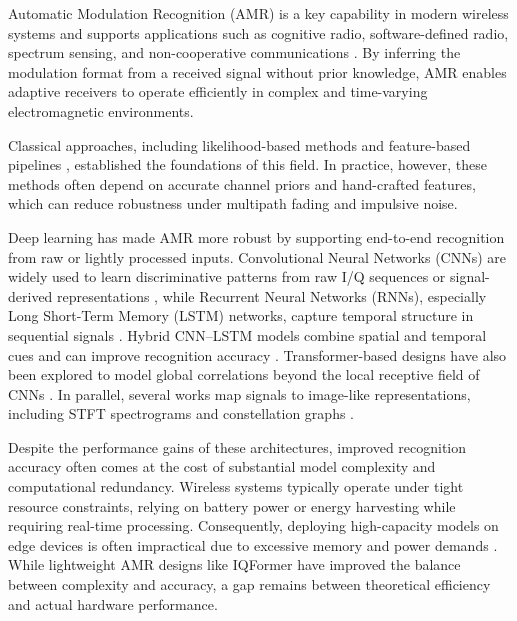\documentclass{article}
\begin{document}
	Automatic Modulation Recognition (AMR) is a key capability in modern wireless systems and supports applications such as cognitive radio, software-defined radio, spectrum sensing, and non-cooperative communications \cite{xu2020spatiotemporalmultichannela}.
	By inferring the modulation format from a received signal without prior knowledge, AMR enables adaptive receivers to operate efficiently in complex and time-varying electromagnetic environments.
	
	Classical approaches, including likelihood-based methods \cite{zhu2018likelihoodbasedalgorithm, dulek2017Onlinehybrid} and feature-based pipelines \cite{huang2017Automaticmodulation, ma2019Automaticmodulation}, established the foundations of this field.
	In practice, however, these methods often depend on accurate channel priors and hand-crafted features, which can reduce robustness under multipath fading and impulsive noise.
	
	Deep learning has made AMR more robust by supporting end-to-end recognition from raw or lightly processed inputs.
	Convolutional Neural Networks (CNNs) are widely used to learn discriminative patterns from raw I/Q sequences or signal-derived representations \cite{oshea2016Convolutionalradiob, oshea2018Overtheairdeepa, wang2019Datadrivendeepa}, while Recurrent Neural Networks (RNNs), especially Long Short-Term Memory (LSTM) networks, capture temporal structure in sequential signals \cite{chen2020Automaticmodulation, liu2021Automaticmodulation, ke2022Realtimeradioa}.
	Hybrid CNN--LSTM models combine spatial and temporal cues and can improve recognition accuracy \cite{njoku2021CGDNetEfficientb, wang2021MultidimensionalCNNLSTM, zhang2020Automaticmodulation}.
	Transformer-based designs have also been explored to model global correlations beyond the local receptive field of CNNs \cite{rashvand2024Enhancingautomatic, hou2024ClSTconvolutional, zhang2024CTRNetautomatica}.
	In parallel, several works map signals to image-like representations, including STFT spectrograms and constellation graphs \cite{chen2022SigNetnovel, lin2022Modulationrecognition, ghasemzadeh2023GGCNNefficiencymaximizing}.
	
	Despite the performance gains of these architectures, improved recognition accuracy often comes at the cost of substantial model complexity and computational redundancy. Wireless systems typically operate under tight resource constraints, relying on battery power or energy harvesting while requiring real-time processing. Consequently, deploying high-capacity models on edge devices is often impractical due to excessive memory and power demands \cite{baishya2024Edgeefficientdeep}. While lightweight AMR designs like IQFormer \cite{shao2025IQFormernovel} have improved the balance between complexity and accuracy, a gap remains between theoretical efficiency and actual hardware performance.
	
\end{document}
